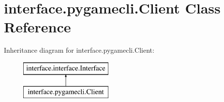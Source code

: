\hypertarget{classinterface_1_1pygamecli_1_1_client}{\section{interface.\-pygamecli.\-Client \-Class \-Reference}
\label{classinterface_1_1pygamecli_1_1_client}
}
\-Inheritance diagram for interface.\-pygamecli.\-Client\-:\begin{figure}[H]
\begin{center}
\leavevmode
\includegraphics[height=2.000000cm]{classinterface_1_1pygamecli_1_1_client}
\end{center}
\end{figure}
